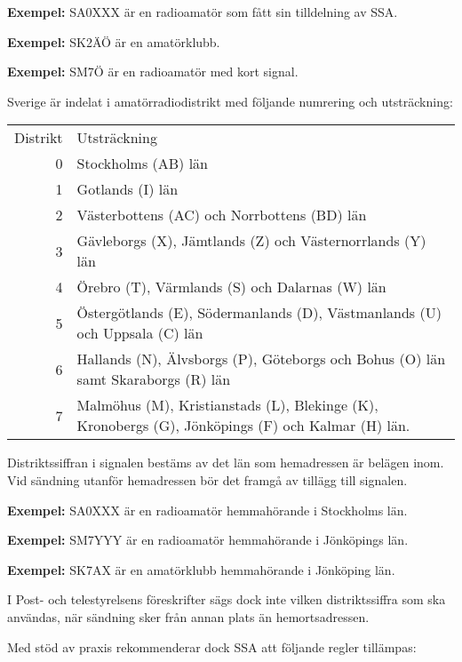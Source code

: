 \textbf{Exempel:} SA0XXX är en radioamatör som fått sin tilldelning av SSA.

\textbf{Exempel:} SK2ÄÖ är en amatörklubb.

\textbf{Exempel:} SM7Ö är en radioamatör med kort signal.

Sverige är indelat i amatörradiodistrikt med följande numrering och
utsträckning:

\begin{tabular}{rp{10cm}}
Distrikt & Utsträckning \\
0 & Stockholms (AB) län \\
1 & Gotlands (I) län \\
2 & Västerbottens (AC) och Norrbottens (BD) län \\
3 & Gävleborgs (X), Jämtlands (Z) och Västernorrlands (Y) län \\
4 & Örebro (T), Värmlands (S) och Dalarnas (W) län \\
5 & Östergötlands (E), Södermanlands (D), Västmanlands (U) och Uppsala (C) län\\
6 & Hallands (N), Älvsborgs (P), Göteborgs och Bohus (O) län samt Skaraborgs (R) län \\
7 & Malmöhus (M), Kristianstads (L), Blekinge (K), Kronobergs (G), Jönköpings (F) och Kalmar (H) län.\\
\end{tabular}

Distriktssiffran i signalen bestäms av det län som hemadressen är
belägen inom. Vid sändning utanför hemadressen bör det framgå av
tillägg till signalen.

\textbf{Exempel:} SA0XXX är en radioamatör hemmahörande i Stockholms län.

\textbf{Exempel:} SM7YYY är en radioamatör hemmahörande i Jönköpings län.

\textbf{Exempel:} SK7AX är en amatörklubb hemmahörande i Jönköping län.

I Post- och telestyrelsens föreskrifter sägs dock inte vilken
distriktssiffra som ska användas, när sändning sker från annan plats
än hemortsadressen.

Med stöd av praxis rekommenderar dock SSA att följande regler
tillämpas:

